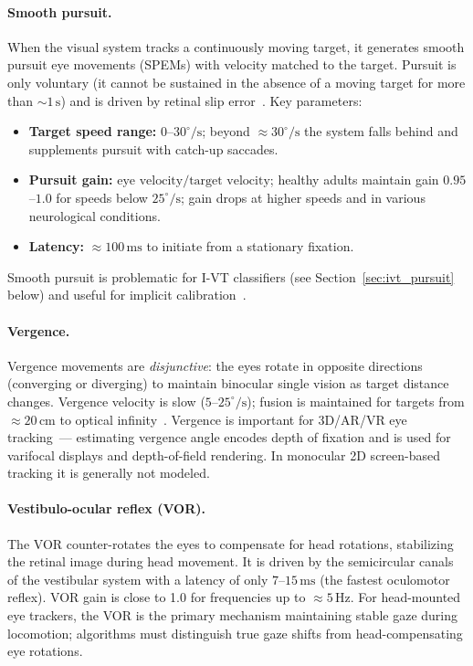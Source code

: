 \documentclass[11pt,a4paper]{article}
\begin{document}
\paragraph{Smooth pursuit.}
When the visual system tracks a continuously moving target, it generates smooth pursuit eye movements (SPEMs) with velocity matched to the target.
Pursuit is only voluntary (it cannot be sustained in the absence of a moving target for more than $\sim1\,\text{s}$) and is driven by retinal slip error~\cite{leigh2015neurology}.
Key parameters:
\begin{itemize}
  \item \textbf{Target speed range:} $0$--$30^\circ/\text{s}$; beyond $\approx 30^\circ/\text{s}$ the system falls behind and supplements pursuit with catch-up saccades.
  \item \textbf{Pursuit gain:} $\text{eye velocity} / \text{target velocity}$; healthy adults maintain gain $0.95$--$1.0$ for speeds below $25^\circ/\text{s}$; gain drops at higher speeds and in various neurological conditions.
  \item \textbf{Latency:} $\approx 100\,\text{ms}$ to initiate from a stationary fixation.
\end{itemize}
Smooth pursuit is problematic for I-VT classifiers (see Section~\ref{sec:ivt_pursuit} below) and useful for implicit calibration~\cite{vidal2013pursuits}.

\paragraph{Vergence.}
Vergence movements are \textit{disjunctive}: the eyes rotate in opposite directions (converging or diverging) to maintain binocular single vision as target distance changes.
Vergence velocity is slow ($5$--$25^\circ/\text{s}$); fusion is maintained for targets from $\approx 20\,\text{cm}$ to optical infinity~\cite{leigh2015neurology}.
Vergence is important for 3D/AR/VR eye tracking~--- estimating vergence angle encodes depth of fixation and is used for varifocal displays and depth-of-field rendering.
In monocular 2D screen-based tracking it is generally not modeled.

\paragraph{Vestibulo-ocular reflex (VOR).}
The VOR counter-rotates the eyes to compensate for head rotations, stabilizing the retinal image during head movement.
It is driven by the semicircular canals of the vestibular system with a latency of only $7$--$15\,\text{ms}$ (the fastest oculomotor reflex).
VOR gain is close to 1.0 for frequencies up to $\approx5\,\text{Hz}$.
For head-mounted eye trackers, the VOR is the primary mechanism maintaining stable gaze during locomotion; algorithms must distinguish true gaze shifts from head-compensating eye rotations.
\end{document}
